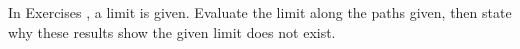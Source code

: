{\noindent In Exercises}
{, a limit is given. Evaluate the limit along the paths given, then state why these results show the given limit does not exist.}
